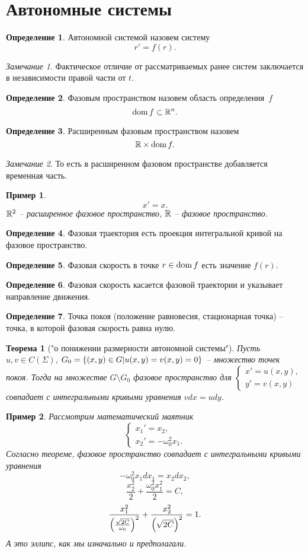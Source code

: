\documentclass[a5paper, 10pt]{article}
\theoremstyle{definition}
\newtheorem{Def}{Определение}
\theoremstyle{plain}
\newtheorem{Th}{Теорема}
\newtheorem{Ex}{Пример}
\theoremstyle{remark}
\newtheorem*{Note}{Замечание}
\begin{document}
		\section{Автономные системы}
		\begin{Def}
			Автономной системой назовем систему \[r'=f(r).\]
		\end{Def}
		\begin{Note}
			Фактическое отличие от рассматриваемых ранее систем заключается в независимости правой части от $t$.
		\end{Note}
		\begin{Def}
			Фазовым пространством назовем область определения~$f$ 
			\[
			\operatorname{dom} f \subset \mathbb{R}^n.
			\]
		\end{Def}
		\begin{Def}
			Расширенным фазовым пространством назовем \[\mathbb{R} \times \operatorname{dom} f.\]
		\end{Def}
		\begin{Note}
			То есть в расширенном фазовом пространстве добавляется временная часть.
		\end{Note}
	\begin{Ex}
		\[
		x'=x.
		\]
		$\mathbb{R}^2$ -- расширенное фазовое пространство, $\mathbb{R}$ -- фазовое пространство.
	\end{Ex}
	\begin{Def}
		Фазовая траектория есть проекция интегральной кривой на фазовое пространство.
	\end{Def}
	\begin{Def}
		Фазовая скорость в точке $r \in \operatorname{dom} f$ есть значение $f(r)$.
	\end{Def}
	\begin{Def}
		Фазовая скорость касается фазовой траектории и указывает направление движения.
	\end{Def}
\begin{Def}
	Точка покоя (положение равновесия, стационарная точка) -- точка, в которой фазовая скорость равна нулю.
\end{Def}
\begin{Th}["о понижении размерности автономной системы"]
	Пусть $u,v \in C(\Sigma)$, $G_0 = \left\{(x,y)\in G | u(x,y) = v(x,y) = 0\right\}$ -- множество точек покоя. 
	Тогда на множестве $G \setminus G_0$ фазовое пространство для $\begin{cases}
		x' = u(x,y),\\y'=v(x,y)
	\end{cases}$ совпадает с интегральными кривыми уравнения $vdx = udy$.
\end{Th}
\begin{Ex}
	Рассмотрим математический маятник
	\[
	\begin{cases}
		x_1' = x_2,\\
		x_2' = -\omega_0^2 x_1.
	\end{cases}
	\]
	Согласно теореме, фазовое пространство совпадает с интегральными кривыми уравнения 
	\[
	-\omega_0^2 x_1 dx_1 = x_2dx_2,
	\]
	\[
	\frac{x_2^2}{2} + \frac{\omega_0^2 x_1^2}{2} = C,
	\]
	\[
	\frac{x_1^2}{\left(\frac{\sqrt{2C}}{\omega_0}\right)^2} + \frac{x_2^2}{\left(\sqrt{2C}\right)^2} = 1.
	\]
	А это эллипс, как мы изначально и предполагали.
\end{Ex}
\end{document}
